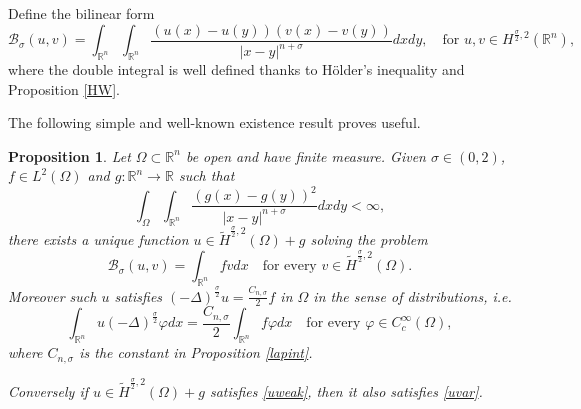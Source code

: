 \documentclass[11pt, a4paper]{article}
\newtheorem{prop}[trm]{Proposition}
\newcommand{\R}{\mathbb{R}}
\newcommand{\M}[1]{\mathcal{#1}}
\begin{document}
\medskip

Define the bilinear form
$$\M{B}_\sigma(u,v)=\int_{\R^n}\int_{\R^n} \frac{(u(x)-u(y))(v(x)-v(y))}{|x-y|^{n+\sigma}}dxdy,\quad \text{for }u,v\in H^{\frac\sigma2,2}(\R^n),$$
where the double integral is well defined thanks to H\"older's inequality and Proposition \ref{HW}. 

The following simple and well-known existence result proves useful.

\begin{prop}\label{trmexist}
Let $\Omega\subset\R^n$ be open and have finite measure. Given $\sigma\in (0,2)$, $f\in L^2(\Omega)$ and $g:\R^n\to \R$ such that
\begin{equation}\label{intg}
\int_\Omega\int_{\R^n}\frac{(g(x)-g(y))^2}{|x-y|^{n+\sigma}}dxdy<\infty,
\end{equation}
there exists a unique function $u\in \tilde H^{\frac\sigma2,2}(\Omega)+g$ solving the problem
\begin{equation}\label{uvar}
\M{B}_\sigma(u,v)=\int_{\R^n} f v dx\quad \text{for every }v\in \tilde H^{\frac\sigma2,2}(\Omega).
\end{equation}
Moreover such $u$ satisfies $(-\Delta)^\frac{\sigma}{2} u=\frac{C_{n,\sigma}}{2}f$ in $\Omega$ in the sense of distributions, i.e.
\begin{equation}\label{uweak}
\int_{\R^n} u(-\Delta)^\frac{\sigma}{2} \varphi dx=\frac{C_{n,\sigma}}{2}\int_{\R^n} f\varphi dx\quad \text{for every }\varphi \in C^\infty_c(\Omega),
\end{equation}
where $C_{n,\sigma}$ is the constant in Proposition \ref{lapint}.

Conversely if $u\in \tilde H^{\frac \sigma2,2}(\Omega)+g$ satisfies \eqref{uweak}, then it also satisfies \eqref{uvar}.
\end{prop}
\end{document}
